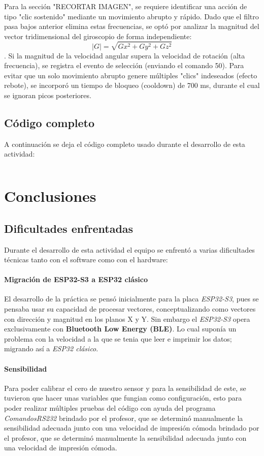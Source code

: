 \documentclass[conference]{IEEEtran}
\begin{document}
Para la sección "RECORTAR IMAGEN", se requiere identificar una acción de tipo "clic sostenido" mediante un movimiento abrupto y rápido. Dado que el filtro pasa bajos anterior elimina estas frecuencias, se optó por analizar la magnitud del vector tridimensional del giroscopio de forma independiente:$$|G| = \sqrt{Gx^2 + Gy^2 + Gz^2}$$. Si la magnitud de la velocidad angular supera la velocidad de rotación (alta frecuencia), se registra el evento de selección (enviando el comando 50). Para evitar que un solo movimiento abrupto genere múltiples "clics" indeseados (efecto rebote), se incorporó un tiempo de bloqueo (cooldown) de 700 ms, durante el cual se ignoran picos posteriores.

  \newpage
  \subsection{Código completo}
    A continuación se deja el código completo usado durante el desarrollo de esta actividad:
    \inputminted{cpp}{Act04.ino}



\section{Conclusiones}
  \subsection{Dificultades enfrentadas}
  Durante el desarrollo de esta actividad el equipo se enfrentó a varias dificultades técnicas tanto con el software como con el hardware:
  \paragraph{Migración de ESP32-S3 a ESP32 clásico} El desarrollo de la práctica se pensó inicialmente para la placa \textit{ESP32-S3}, pues se pensaba usar su capacidad de procesar vectores, conceptualizando como vectores con dirección y magnitud en los planos X y Y. Sin  embargo el \textit{ESP32-S3} opera exclusivamente con \textbf{Bluetooth Low Energy (BLE)}. Lo cual suponía un problema con la velocidad a la que se tenia que leer e imprimir los datos; migrando así a \textit{ESP32 clásico}.
  \paragraph{Sensibilidad} Para poder calibrar el cero de nuestro sensor y para la sensibilidad de este, se tuvieron que hacer unas variables que fungian como configuración, esto para poder realizar múltiples pruebas del código con ayuda del programa \textit{ComandosRS232} brindado por el profesor, que se determinó manualmente la sensibilidad adecuada junto con una velocidad de impresión cómoda brindado por el profesor, que se determinó manualmente la sensibilidad adecuada junto con una velocidad de impresión cómoda.
\end{document}
